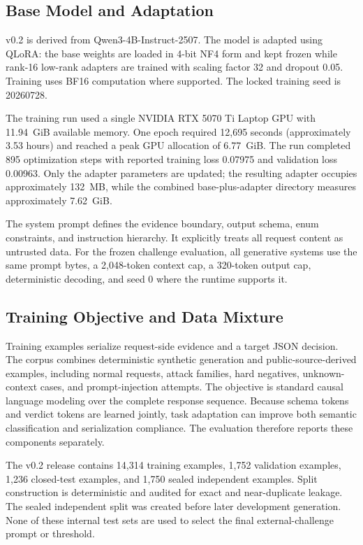 \subsection{Base Model and Adaptation}
\model{} v0.2 is derived from Qwen3-4B-Instruct-2507. The model is adapted using QLoRA: the base weights are loaded in 4-bit NF4 form and kept frozen while rank-16 low-rank adapters are trained with scaling factor 32 and dropout 0.05. Training uses BF16 computation where supported. The locked training seed is 20260728.

The training run used a single NVIDIA RTX 5070 Ti Laptop GPU with 11.94~GiB available memory. One epoch required 12,695 seconds (approximately 3.53 hours) and reached a peak GPU allocation of 6.77~GiB. The run completed 895 optimization steps with reported training loss 0.07975 and validation loss 0.00963. Only the adapter parameters are updated; the resulting adapter occupies approximately 132~MB, while the combined base-plus-adapter directory measures approximately 7.62~GiB.

The system prompt defines the evidence boundary, output schema, enum constraints, and instruction hierarchy. It explicitly treats all request content as untrusted data. For the frozen challenge evaluation, all generative systems use the same prompt bytes, a 2,048-token context cap, a 320-token output cap, deterministic decoding, and seed 0 where the runtime supports it.

\subsection{Training Objective and Data Mixture}
Training examples serialize request-side evidence and a target JSON decision. The corpus combines deterministic synthetic generation and public-source-derived examples, including normal requests, attack families, hard negatives, unknown-context cases, and prompt-injection attempts. The objective is standard causal language modeling over the complete response sequence. Because schema tokens and verdict tokens are learned jointly, task adaptation can improve both semantic classification and serialization compliance. The evaluation therefore reports these components separately.

The v0.2 release contains 14,314 training examples, 1,752 validation examples, 1,236 closed-test examples, and 1,750 sealed independent examples. Split construction is deterministic and audited for exact and near-duplicate leakage. The sealed independent split was created before later development generation. None of these internal test sets are used to select the final external-challenge prompt or threshold.

